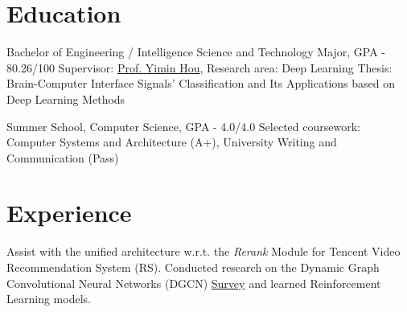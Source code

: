 \documentclass{my_cv}
\begin{document}
\hspace*{\fill}


\hspace*{\fill}


\hspace*{\fill} 

\section{Education}

\workitemsthree
{Bachelor of Engineering / Intelligence Science and Technology Major, GPA - 80.26/100}
{Supervisor: \href{mailto:ymh7821@163.com}{Prof. Yimin Hou}, Research area: Deep Learning}
{Thesis: Brain-Computer Interface Signals' Classification and Its Applications based on Deep Learning Methods}

\workitemstwo
{Summer School, Computer Science, GPA - 4.0/4.0}
{Selected coursework: Computer Systems and Architecture (A+), University Writing and Communication (Pass)}

\hspace*{\fill} 

\section{Experience}
\workitemstwo
{Assist with the unified architecture w.r.t. the \emph{Rerank} Module for Tencent Video Recommendation System (RS).}
{Conducted research on the Dynamic Graph Convolutional Neural Networks (DGCN) \href{https://shuyuej.com/files/Dynamic-GCN-Survey.pdf}{Survey} and learned Reinforcement Learning models.}
\end{document}

